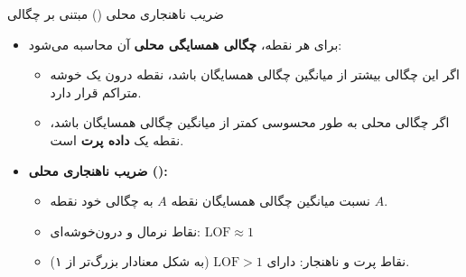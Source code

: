 \begin{frame}{ضریب ناهنجاری محلی () مبتنی بر چگالی}{}
  \begin{itemize}
    \setlength{\itemsep}{5pt}
    \item برای هر نقطه، \textbf{چگالی همسایگی محلی} آن محاسبه می‌شود:
    \begin{itemize}
      \setlength{\itemsep}{3pt}
      \item اگر این چگالی بیشتر از میانگین چگالی همسایگان باشد، نقطه درون یک خوشه متراکم قرار دارد.
      \item اگر چگالی محلی به طور محسوسی کمتر از میانگین چگالی همسایگان باشد، نقطه یک \textbf{داده پرت} است.
    \end{itemize}
    \item \textbf{ضریب ناهنجاری محلی ():}
    \begin{itemize}
      \item نسبت میانگین چگالی همسایگان نقطه $A$ به چگالی خود نقطه $A$.
      \item نقاط نرمال و درون‌خوشه‌ای: $\text{LOF} \approx 1$
      \item نقاط پرت و ناهنجار: دارای $\text{LOF} > 1$ (به شکل معنادار بزرگ‌تر از ۱).
    \end{itemize}
  \end{itemize}
\end{frame}

